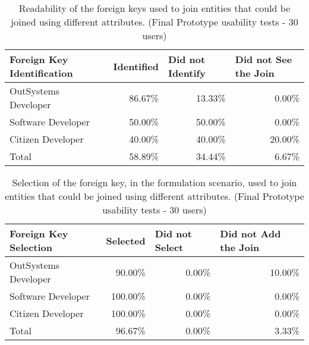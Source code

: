 \begin{table}[tb]
  \caption{Readability of the foreign keys used to join entities that could be joined using different attributes. (Final Prototype usability tests - 30 users)}
    \label{tab:finalPrototypeForeignKeyIdentification}
  \begin{tabular}{@{}lrrr@{}}
  \toprule
  \textbf{Foreign Key Identification} & \multicolumn{1}{l}{Identified} & \multicolumn{1}{l}{Did not Identify} & \multicolumn{1}{l}{Did not See the Join} \\ \midrule
  OutSystems Developer                & 86.67\%                        & 13.33\%                              & 0.00\%                                   \\
  Software Developer                  & 50.00\%                        & 50.00\%                              & 0.00\%                                   \\
  Citizen Developer                   & 40.00\%                        & 40.00\%                              & 20.00\%                                  \\
  Total                               & 58.89\%                        & 34.44\%                              & 6.67\%                                   \\ \bottomrule
  \end{tabular}
  \end{table}

\begin{table}[tb]
  \caption{Selection of the foreign key, in the formulation scenario, used to join entities that could be joined using different attributes. (Final Prototype usability tests - 30 users)}
    \label{tab:finalPrototypeForeignKeySelection}
  \begin{tabular}{@{}lrrr@{}}
  \toprule
  \textbf{Foreign Key Selection} & \multicolumn{1}{l}{Selected} & \multicolumn{1}{l}{Did not Select} & \multicolumn{1}{l}{Did not Add the Join} \\ \midrule
  OutSystems Developer           & 90.00\%                      & 0.00\%                             & 10.00\%                                  \\
  Software Developer             & 100.00\%                     & 0.00\%                             & 0.00\%                                   \\
  Citizen Developer              & 100.00\%                     & 0.00\%                             & 0.00\%                                   \\
  Total                          & 96.67\%                      & 0.00\%                             & 3.33\%                                   \\ \bottomrule
  \end{tabular}
  \end{table}

